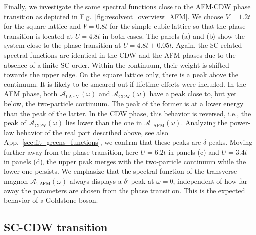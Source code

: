 \documentclass[
    reprint, 
    aps,
    preprintnumbers,
    twocolumn,
    prb,
    superscriptaddress
]{revtex4-2}
\newcommand{\spectral}[1]{\mathcal{A}_\text{#1}  (\omega)}
\begin{document}

Finally, we investigate the same spectral functions close to the AFM-CDW phase transition
as depicted in Fig.\ \ref{fig:resolvent_overview_AFM}.
We choose $V=1.2t$ for the square lattice and $V=0.8t$ for the simple cubic lattice so that
the phase transition is located at $U=4.8t$ in both cases. 
The panels (a) and (b) show the system close to the phase transition at $U=4.8t \pm 0.05t$.
Again, the SC-related spectral functions are identical in the CDW and the AFM phases
due to the absence of a finite SC order.
Within the continuum, their weight is shifted towards the upper edge.
On the square lattice only, there is a peak above the continuum.
It is likely to be smeared out if lifetime effects were included.
In the AFM phase, both $\spectral{l.AFM}$ and $\spectral{CDW}$ have a peak close to, but yet below, the two-particle continuum. 
The peak of the former is at a lower energy than the peak of the latter.
In the CDW phase, this behavior is reversed, i.e., the peak of $\spectral{CDW}$ lies lower
than the one in $\spectral{l.AFM}$.
Analyzing the power-law behavior of the real part described above, see also
App.\ \ref{sec:fit_greens_functions}, we confirm that these peaks are $\delta$ peaks.
Moving further away from the phase transition, here $U=6.2t$ in panels (c) and $U=3.4t$ in panels (d),
the upper peak merges with the two-particle continuum while the lower one persists.
We emphasize that the spectral function of the transverse magnon $\spectral{t.AFM}$ always 
displays a $\delta'$ peak at $\omega=0$, independent of how far away the parameters are chosen
from the phase transition. This is the expected behavior of a Goldstone boson.



\subsection{SC-CDW transition}
\end{document}
